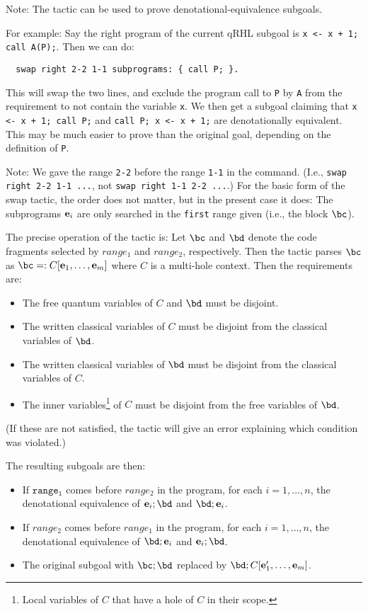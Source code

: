 \documentclass{article}
\begin{document}
Note: The  tactic can be used to prove denotational-equivalence subgoals.

\medskip

For example: Say the right program of the current qRHL subgoal is \texttt{x <- x + 1; call A(P);}. Then we can do:
\begin{lstlisting}
  swap right 2-2 1-1 subprograms: { call P; }.
\end{lstlisting}
This will swap the two lines, and exclude the program call to \texttt{P} by \texttt{A} from the requirement to not contain the variable \texttt{x}.
We then get a subgoal claiming that \texttt{x <- x + 1; call P;} and \texttt{call P; x <- x + 1;} are denotationally equivalent.
This may be much easier to prove than the original goal, depending on the definition of \texttt{P}.

Note: We gave the range \texttt{2-2} before the range \texttt{1-1} in the command.
(I.e., \texttt{swap right 2-2 1-1 ...}, not \texttt{swap right 1-1 2-2 ...}.)
For the basic form of the swap tactic, the order does not matter, but in the present case it does:
The subprograms $\mathbf e_i$ are only searched in the \texttt{first} range given (i.e., the block $\bc$).

\medskip

The precise operation of the tactic is:
Let $\bc$ and $\bd$ denote the code fragments selected by $\mathit{range_1}$ and $\mathit{range_2}$, respectively.
Then the tactic parses $\bc$ as $\bc=:C[\be_1,\dots,\be_m]$ where $C$ is a multi-hole context. Then the requirements are:
\begin{itemize}
\item The free quantum variables of $C$ and $\bd$ must be disjoint.
\item The written classical variables of $C$ must be disjoint from the classical variables of $\bd$.
\item The written classical variables of $\bd$ must be disjoint from the classical variables of $C$.
\item The inner variables\footnote{Local variables of $C$ that have a hole of $C$ in their scope.} of $C$ must be disjoint from the free variables of $\bd$.
\end{itemize}
(If these are not satisfied, the tactic will give an error explaining which condition was violated.)

The resulting subgoals are then:
\begin{itemize}
\item If $\mathtt{range_1}$ comes before $\mathit{range_2}$ in the program, for each $i=1,\dots,n$, the denotational equivalence of  ${\be_i;\bd}$ and $\bd;\be_i$.
\item If $\mathit{range_2}$ comes before $\mathit{range_1}$ in the program, for each $i=1,\dots,n$, the denotational equivalence of   $\bd;\be_i$ and ${\be_i;\bd}$.
\item The original subgoal with $\bc;\bd$ replaced by $\bd;C[\be_1',\dots,\be_m]$.
\end{itemize}
\end{document}
